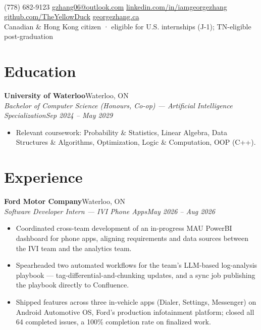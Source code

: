 \documentclass[letterpaper,11pt]{article}
\newcommand{\sep}{\hspace{0.5em}\textcolor{accent!55}{\textbar}\hspace{0.5em}}
\newcommand{\entry}[4]{%
  \textbf{#1}\hfill{\small #2}\\[1pt]%
  {\small\itshape #3}\hfill{\small\itshape #4}\par%
}
\newenvironment{bullets}
  {\begin{itemize}[leftmargin=1.5em,labelsep=0.5em,itemsep=1pt,topsep=1pt,parsep=0pt,partopsep=0pt]\small}
  {\end{itemize}\vspace{1pt}}
\begin{document}
\begin{center}
  {\Huge\bfseries\color{accent}}\\[5pt]
  {\footnotesize
  (778) 682-9123 \sep
  \href{mailto:gzhang06@outlook.com}{gzhang06@outlook.com} \sep
  \href{https://linkedin.com/in/iamgeorgezhang}{linkedin.com/in/iamgeorgezhang} \sep
  \href{https://github.com/TheYellowDuck}{github.com/TheYellowDuck} \sep
  \href{https://georgezhang.ca}{georgezhang.ca}
  \\[3pt]Canadian \& Hong Kong citizen \; · \; eligible for U.S. internships (J-1); TN-eligible post-graduation}
\end{center}

\section{Education}
\entry{University of Waterloo}{Waterloo, ON}{Bachelor of Computer Science (Honours, Co-op) --- Artificial Intelligence Specialization}{Sep 2024 -- May 2029}
\begin{bullets}
  \item Relevant coursework: Probability \& Statistics, Linear Algebra, Data Structures \& Algorithms, Optimization, Logic \& Computation, OOP (C++).
\end{bullets}

\section{Experience}

\entry{Ford Motor Company}{Waterloo, ON}{Software Developer Intern --- IVI Phone Apps}{May 2026 -- Aug 2026}
\begin{bullets}
  \item Coordinated cross-team development of an in-progress MAU PowerBI dashboard for phone apps, aligning requirements and data sources between the IVI team and the analytics team.
  \item Spearheaded two automated workflows for the team's LLM-based log-analysis playbook --- tag-differential-and-chunking updates, and a sync job publishing the playbook directly to Confluence.
  \item Shipped features across three in-vehicle apps (Dialer, Settings, Messenger) on Android Automotive OS, Ford's production infotainment platform; closed all 64 completed issues, a 100\% completion rate on finalized work.
\end{bullets}
\end{document}

